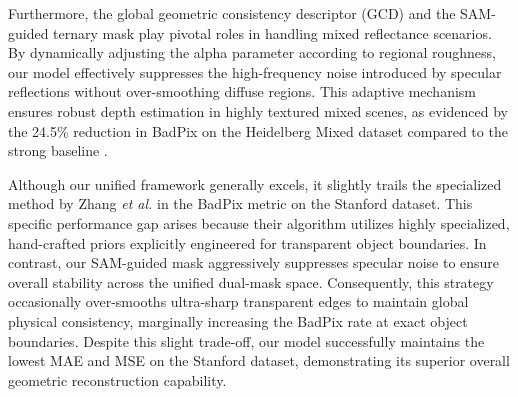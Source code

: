 \documentclass[lettersize,journal]{IEEEtran}
\begin{document}
Furthermore, the global geometric consistency descriptor (GCD) and the SAM-guided ternary mask play pivotal roles in handling mixed reflectance scenarios. By dynamically adjusting the alpha parameter according to regional roughness, our model effectively suppresses the high-frequency noise introduced by specular reflections without over-smoothing diffuse regions. This adaptive mechanism ensures robust depth estimation in highly textured mixed scenes, as evidenced by the 24.5\% reduction in BadPix on the Heidelberg Mixed dataset compared to the strong baseline \cite{wang2023}.

Although our unified framework generally excels, it slightly trails the specialized method by Zhang \textit{et al.} \cite{zhang2023} in the BadPix metric on the Stanford dataset. This specific performance gap arises because their algorithm utilizes highly specialized, hand-crafted priors explicitly engineered for transparent object boundaries. In contrast, our SAM-guided mask aggressively suppresses specular noise to ensure overall stability across the unified dual-mask space. Consequently, this strategy occasionally over-smooths ultra-sharp transparent edges to maintain global physical consistency, marginally increasing the BadPix rate at exact object boundaries. Despite this slight trade-off, our model successfully maintains the lowest MAE and MSE on the Stanford dataset, demonstrating its superior overall geometric reconstruction capability.
\end{document}

